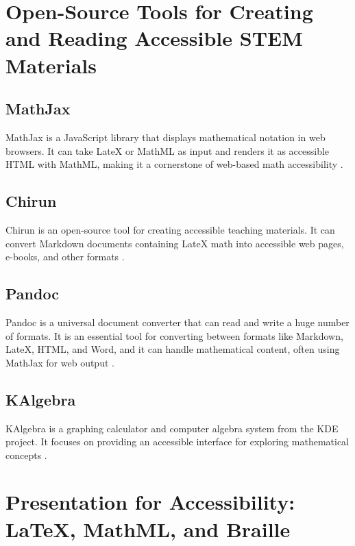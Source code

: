\section{Open-Source Tools for Creating and Reading Accessible STEM Materials}\label{ch11:sec:open-source-tools}
\subsection{MathJax}\label{ch11:ssec:mathjax}
MathJax is a JavaScript library that displays mathematical notation in web browsers. It can take \gls{LateX} or \gls{MathML} as input and renders it as accessible HTML with \gls{MathML}, making it a cornerstone of web-based math accessibility \supercite{MathJax, MathJaxDocs}.

\subsection{Chirun}\label{ch11:ssec:chirun}
Chirun is an open-source tool for creating accessible teaching materials. It can convert Markdown documents containing \gls{LateX} math into accessible web pages, e-books, and other formats \supercite{Chirun}.

\subsection{Pandoc}\label{ch11:ssec:pandoc}
Pandoc is a universal document converter that can read and write a huge number of formats. It is an essential tool for converting between formats like Markdown, \gls{LateX}, HTML, and Word, and it can handle mathematical content, often using MathJax for web output \supercite{Pandoc}.

\subsection{KAlgebra}\label{ch11:ssec:kalgebra}
KAlgebra is a graphing calculator and computer algebra system from the KDE project. It focuses on providing an accessible interface for exploring mathematical concepts \supercite{KAlgebra}.

\section{Presentation for Accessibility: LaTeX, MathML, and Braille}\label{ch11:sec:presentation}
